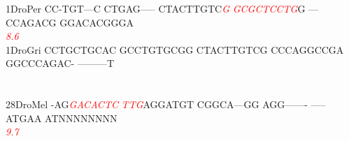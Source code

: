 \documentclass[11pt,twoside,reqno,a4paper]{article}
\begin{document}
{1\hspace*{3\charwidth}DroPer	CC-TGT---C	CTGAG-----	CTACTTGTC\textit{\textcolor{Red}{G}}	\textit{\textcolor{Red}{G}}\textit{\textcolor{Red}{C}}\textit{\textcolor{Red}{G}}\textit{\textcolor{Red}{C}}\textit{\textcolor{Red}{T}}\textit{\textcolor{Red}{C}}\textit{\textcolor{Red}{C}}\textit{\textcolor{Red}{T}}\textit{\textcolor{Red}{G}}G	---CCAGACG	GGACACGGGA	\\
\hspace*{4\charwidth}\hspace*{7\charwidth}\hspace*{1\charwidth}\hspace*{1\charwidth}\hspace*{29\charwidth}\textit{\textcolor{Red}{8.6}}\hspace*{1\charwidth}\hspace*{1\charwidth}\hspace*{1\charwidth}\hspace*{1\charwidth}\\
1\hspace*{3\charwidth}DroGri	CCTGCTGCAC	GCCTGTGCGG	CTACTTGTCG	CCCAGGCCGA	GGCCCAGAC-	---------T	\\
\hspace*{4\charwidth}\hspace*{7\charwidth}\hspace*{1\charwidth}\hspace*{1\charwidth}\hspace*{1\charwidth}\hspace*{1\charwidth}\hspace*{1\charwidth}\hspace*{1\charwidth}\\
\\
28\hspace*{2\charwidth}DroMel	-AG\textit{\textcolor{Red}{G}}\textit{\textcolor{Red}{A}}\textit{\textcolor{Red}{C}}\textit{\textcolor{Red}{A}}\textit{\textcolor{Red}{C}}\textit{\textcolor{Red}{T}}\textit{\textcolor{Red}{C}}	\textit{\textcolor{Red}{T}}\textit{\textcolor{Red}{T}}\textit{\textcolor{Red}{G}}AGGATGT	CGGCA---GG	AGG-------	-----ATGAA	ATNNNNNNNN	\\
\hspace*{4\charwidth}\hspace*{7\charwidth}\hspace*{3\charwidth}\textit{\textcolor{Red}{9.7}}\hspace*{1\charwidth}\hspace*{1\charwidth}\hspace*{1\charwidth}\hspace*{1\charwidth}\hspace*{1\charwidth}\hspace*{1\charwidth}\\
}
\end{document}
